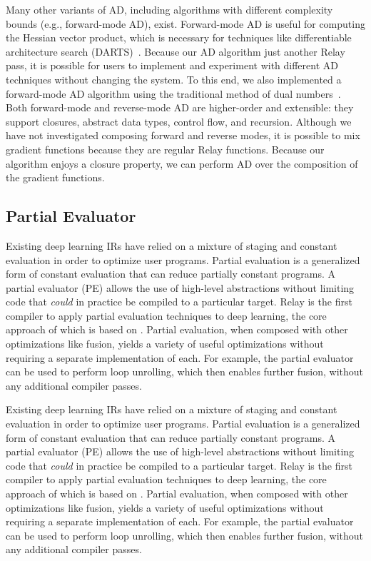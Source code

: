 Many other variants of AD, including algorithms with different
  complexity bounds (e.g., forward-mode AD), exist.
Forward-mode AD is useful for computing the
  Hessian vector product, which is necessary for techniques like differentiable architecture search
  (DARTS)~\citep{darts}.
Because our AD algorithm just another Relay pass,
  it is possible for users to implement and experiment with different
  AD techniques without changing the system.
To this end, we also implemented a  forward-mode AD algorithm using the traditional method of dual
  numbers~\citep{ad_survey}.
Both forward-mode and reverse-mode AD are higher-order and extensible: they
  support closures, abstract data types, control flow, and recursion.
Although we have not investigated
  composing forward and reverse modes,
  it is possible to mix gradient functions
  because they are regular Relay functions.
Because our algorithm enjoys a closure property,
  we can perform AD over the composition of the gradient
  functions.



\subsection{Partial Evaluator}
\label{sec:partial_eval}




Existing deep learning IRs have relied on
  a mixture of staging and constant evaluation
  in order to optimize user programs.
Partial evaluation is a generalized form of constant
  evaluation that can reduce partially constant
  programs.
A partial evaluator (PE) allows the use of high-level abstractions
  without limiting code that \textit{could} in practice be
  compiled to a particular target.
Relay is the first compiler to apply partial evaluation
  techniques to deep learning, the
  core approach of which is based on \citep{pe_ref}.
Partial evaluation, when composed with other
  optimizations like fusion, yields a variety
  of useful optimizations without requiring
  a separate implementation of each.
For example, the partial evaluator can be used to perform
  loop unrolling, which then enables further fusion,
  without any additional compiler passes.

Existing deep learning IRs have relied on
  a mixture of staging and constant evaluation
  in order to optimize user programs.
Partial evaluation is a generalized form of constant
  evaluation that can reduce partially constant
  programs.
A partial evaluator (PE) allows the use of high-level abstractions
  without limiting code that \textit{could} in practice be
  compiled to a particular target.
Relay is the first compiler to apply partial evaluation
  techniques to deep learning, the
  core approach of which is based on \citep{pe_ref}.
Partial evaluation, when composed with other
  optimizations like fusion, yields a variety
  of useful optimizations without requiring
  a separate implementation of each.
For example, the partial evaluator can be used to perform
  loop unrolling, which then enables further fusion,
  without any additional compiler passes.


